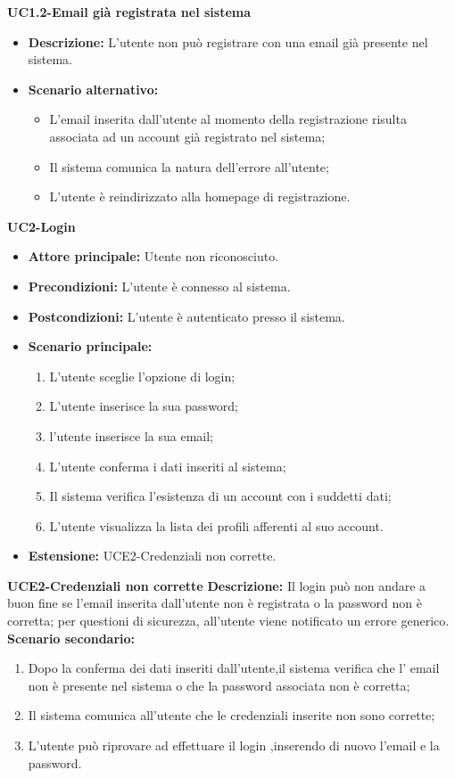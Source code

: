 \textbf{UC1.2-Email già registrata nel sistema}
\begin{itemize}
    \item \textbf{Descrizione: }L'utente non può registrare con una email già presente nel sistema.
    \item \textbf{Scenario alternativo:}
    \begin{itemize}
        \item L'email inserita dall'utente al momento della registrazione risulta associata ad un
        account già registrato nel sistema;
        \item Il sistema comunica la natura dell'errore all'utente;
        \item L'utente è reindirizzato alla homepage di registrazione.
    \end{itemize}
\end{itemize}
\break

\textbf{UC2-Login}
\begin{itemize}
\item \textbf{Attore principale:} Utente non riconosciuto.
\item \textbf{Precondizioni:} L'utente è connesso al sistema.
\item \textbf{Postcondizioni:} L'utente è autenticato presso il sistema.
\item \textbf{Scenario principale:}
\begin{enumerate}
    \item L'utente sceglie l'opzione di login;
    \item L'utente inserisce la sua password;
    \item l'utente inserisce la sua email;
    \item L'utente conferma i dati inseriti al sistema;
    \item Il sistema verifica l'esistenza di un account con i suddetti dati;
    \item L'utente visualizza la lista dei profili afferenti al suo account.
\end{enumerate}
    \item \textbf{Estensione: }UCE2-Credenziali non corrette.
\end{itemize}

\textbf{UCE2-Credenziali non corrette}
\textbf{Descrizione: }Il login può non andare a buon fine se l'email inserita dall'utente non è registrata 
o la password non è corretta; per questioni di sicurezza, all'utente viene notificato un errore generico.
\textbf{Scenario secondario:}
\begin{enumerate}
    \item Dopo la conferma dei dati inseriti dall'utente,il sistema verifica 
    che l' email non è presente nel sistema o che la password associata non è corretta;
    \item Il sistema comunica all'utente che le credenziali inserite non sono corrette;
    \item L'utente può riprovare ad effettuare il login ,inserendo di nuovo l'email e la password.
\end{enumerate}

